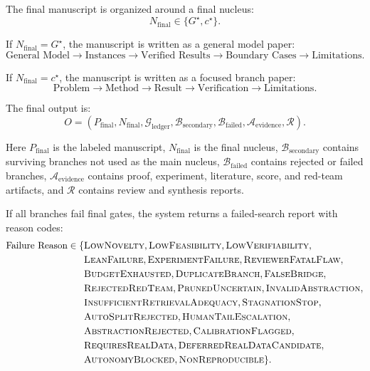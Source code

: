 \documentclass[11pt]{article}
\begin{document}
The final manuscript is organized around a final nucleus:
$$
N_{\text{final}}\in\{G^\star,c^\star\}.
$$

If $N_{\text{final}}=G^\star$, the manuscript is written as a general model paper:
$$
\text{General Model}
\rightarrow
\text{Instances}
\rightarrow
\text{Verified Results}
\rightarrow
\text{Boundary Cases}
\rightarrow
\text{Limitations}.
$$

If $N_{\text{final}}=c^\star$, the manuscript is written as a focused branch paper:
$$
\text{Problem}
\rightarrow
\text{Method}
\rightarrow
\text{Result}
\rightarrow
\text{Verification}
\rightarrow
\text{Limitations}.
$$

The final output is:
$$
O=
(P_{\text{final}},
N_{\text{final}},
\mathcal{G}_{\text{ledger}},
\mathcal{B}_{\text{secondary}},
\mathcal{B}_{\text{failed}},
\mathcal{A}_{\text{evidence}},
\mathcal{R}).
$$

Here $P_{\text{final}}$ is the labeled manuscript, $N_{\text{final}}$ is the final nucleus, $\mathcal{B}_{\text{secondary}}$ contains surviving branches not used as the main nucleus, $\mathcal{B}_{\text{failed}}$ contains rejected or failed branches, $\mathcal{A}_{\text{evidence}}$ contains proof, experiment, literature, score, and red-team artifacts, and $\mathcal{R}$ contains review and synthesis reports.

If all branches fail final gates, the system returns a failed-search report with reason codes:
$$
\begin{aligned}
\text{Failure Reason} \in \{ &\textsc{LowNovelty}, \textsc{LowFeasibility}, \textsc{LowVerifiability}, \\
&\textsc{LeanFailure}, \textsc{ExperimentFailure}, \textsc{ReviewerFatalFlaw}, \\
&\textsc{BudgetExhausted}, \textsc{DuplicateBranch}, \textsc{FalseBridge}, \\
&\textsc{RejectedRedTeam}, \textsc{PrunedUncertain}, \textsc{InvalidAbstraction}, \\
&\textsc{InsufficientRetrievalAdequacy}, \textsc{StagnationStop}, \\
&\textsc{AutoSplitRejected}, \textsc{HumanTailEscalation}, \\
&\textsc{AbstractionRejected}, \textsc{CalibrationFlagged}, \\
&\textsc{RequiresRealData}, \textsc{DeferredRealDataCandidate}, \\
&\textsc{AutonomyBlocked}, \textsc{NonReproducible} \}.
\end{aligned}
$$
\end{document}

